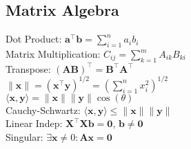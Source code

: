 \subsection*{Matrix Algebra}
Dot Product: $\mathbf{a}^{\top}\mathbf{b} = \sum_{i=1}^{n}a_{i}b_i$\\
Matrix Multiplication: $C_{ij} = \sum_{k=1}^{m} A_{ik}B_{ki}$\\
Transpose: $(\mathbf{A}\mathbf{B})^{\top} = \mathbf{B}^{\top} \mathbf{A}^{\top}$\\
$\lVert \mathbf{x} \rVert = (\mathbf{x}^{\top}\mathbf{y})^{1/2} = \left( \sum_{i=1}^{n} x_i ^2 \right)^{1/2}$\\
$\langle \mathbf{x}, \mathbf{y} \rangle = \lVert \mathbf{x} \rVert \lVert \mathbf{y} \rVert \cos(\theta)$\\
Cauchy-Schwartz: $\langle \mathbf{x}, \mathbf{y} \rangle \leq \lVert \mathbf{x} \rVert \lVert \mathbf{y} \rVert$\\
Linear Indep: $\mathbf{X}^{\top}\mathbf{X}\mathbf{b} = \mathbf{0}$, $\mathbf{b} \neq \mathbf{0}$\\
Singular: $\exists \mathbf{x} \neq 0 : \mathbf{Ax = 0}$\\